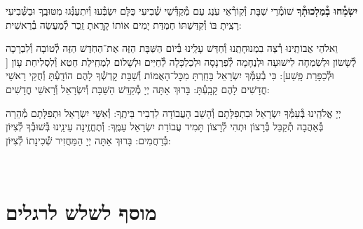 \documentclass[twoside, openany, parskip=half, 11pt]{book}
\begin{document}
\begin{sometimes}
\textbf{יִשְׂמְ֯חוּ בְ֯מַלְכוּתְ֯ךָ}
שׁוֹמְ֯רֵי שַׁבָּת וְ֯קֽוֹרְ֯אֵי עֹֽנֶג עַם מְ֯קַדְּ֯שֵׁי שְׁ֯בִיעִי כֻּלָּם יִשְׂבְּ֯עוּ וְ֯יִתְעַנְּ֯גוּ מִטּוּבֶֽךָ וּבַשְּׁ֯בִיעִי רָצִֽיתָ בּוֹ וְ֯קִדַּשְׁתּוֹ חֶמְדַּת יָמִים אוֹתוֹ קָרָֽאתָ זֵֽכֶר לְ֯מַעֲשֵׂה בְ֯רֵאשִׁית:

 וֵאלֹהֵי אֲבוֹתֵֽינוּ רְ֯צֵה בִמְנוּחָתֵֽנוּ וְ֯חַדֵּשׁ עָלֵֽינוּ בְּ֯יוֹם הַשַּׁבָּת הַזֶּה אֶת־הַחֹֽדֶשׁ הַזֶּה לְ֯טוֹבָה וְ֯לִבְרָכָה לְ֯שָׂשׂוֹן וּלְשִׂמְחָה לִישׁוּעָה וּלְנֶחָמָה לְ֯פַרְנָסָה וּלְכַלְכָּלָה לְ֯חַיִּים וּלְשָׁלוֹם לִמְחִֽילַת חֵטְא וְ֯לִסְלִיחַת עָוֹן [
וּלְ֯כַפָּרַת פָּֽשַׁע]: כִּי בְ֯עַמְּ֯ךָ יִשְׂרָאֵל בָּחַֽרְתָּ מִכׇּל־הָאֻמּוֹת וְ֯שַׁבַּת קׇדְשְׁ֯ךָ לָהֶם הוֹדָֽעְ֯תָּ וְ֯חֻקֵּי רָאשֵׁי חֳדָשִׁים לָהֶם קָבָֽעְ֯תָּ: בָּרוּךְ אַתָּה יְיָ מְ֯קַדֵּשׁ הַשַּׁבָּת וְ֯יִשְׂרָאֵל וְ֯רָאשֵׁי חֳדָשִׁים: 

\end{sometimes}

יְיָ אֱלֹהֵֽינוּ בְּ֯עַמְּ֯ךָ יִשְׂרָאֵל וּבִתְפִלָּתָם וְ֯הָשֵׁב הָעֲבוֹדָה לִדְבִיר בֵּיתֶֽךָ: וְ֯אִשֵּׁי יִשְׂרָאֵל וּתְפִלָּתָם מְ֯הֵרָה בְּ֯אַהֲבָה תְ֯קַבֵּל בְּ֯רָצוֹן וּתְהִי לְ֯רָצוֹן תָּמִיד עֲבוֹדַת יִשְׂרָאֵל עַמֶּֽךָ: וְ֯תֶחֱזֶֽינָה עֵינֵֽינוּ בְּ֯שׁוּבְ֯ךָ לְ֯צִיּוֹן בְּ֯רַחֲמִים:
בָּרוּךְ אַתָּה יְיָ הַמַּחֲזִיר שְׁ֯כִינָתוֹ לְ֯צִיּוֹן:

\modim

\shabboschanukah

\shabboshodos

\vspace{.5\baselineskip}

\shatzbrikaskohanim

\shabbossimshalom


\tachanunim

\\

\section[מוסף לשלש לרגלים]{ מוסף לשלש לרגלים ‎}
\label{musaphregel}



\specialsaavos
\end{document}
